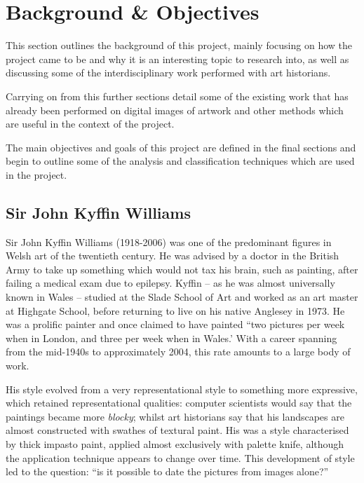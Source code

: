 \chapter{Background \& Objectives}


This section outlines the background of this project, mainly focusing on how the project came to
be and why it is an interesting topic to research into, as well as discussing some of the 
interdisciplinary work performed with art historians.

Carrying on from this further sections detail some of the existing work that has already been 
performed on digital images of artwork and other methods which are useful in the context of the
project.

The main objectives and goals of this project are defined in the final sections and begin to
outline some of the analysis and classification techniques which are used in the project.

\section{Sir John Kyffin Williams}

Sir John Kyffin Williams (1918-2006) was one of the predominant figures in Welsh art of the
twentieth century.  He was advised by a doctor in the British Army to take up something which
would not tax his brain, such as painting, after failing a medical exam due to epilepsy. Kyffin --
as he was almost universally known in Wales -- studied at the Slade School of Art and worked as an
art master at Highgate School, before returning to live on his native Anglesey in 1973.  He was a
prolific painter and once claimed to have painted ``two pictures per week when in London, and 
three per week when in Wales.'\cite[p.209]{Williams1993Across} With a career spanning from the 
mid-1940s to approximately 2004, this rate amounts to a large body of work.

His style evolved from a very representational style to something more
expressive, which retained representational qualities: computer scientists
would say that the paintings became more \emph{blocky}; whilst art
historians say that his landscapes are almost constructed with swathes of textural
paint. His was a style characterised by thick impasto paint, applied almost
exclusively with palette knife, although the application technique appears to
change over time. This development of style led to the question: ``is it possible to
date the pictures from images alone?''

